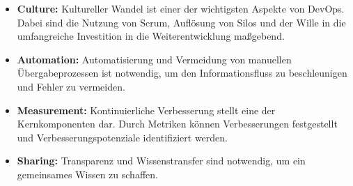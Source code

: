 \begin{itemize}
    \item \textbf{Culture:}
    Kultureller Wandel ist einer der wichtigsten Aspekte von DevOps.
    Dabei sind die Nutzung von Scrum, Auflösung von Silos und der Wille in die umfangreiche Investition in die Weiterentwicklung maßgebend.

    \item \textbf{Automation:}
    Automatisierung und Vermeidung von manuellen Übergabeprozessen ist notwendig, um den Informationsfluss zu beschleunigen und Fehler zu vermeiden.

    \item \textbf{Measurement:}
    Kontinuierliche Verbesserung stellt eine der Kernkomponenten dar.
    Durch Metriken können Verbesserungen festgestellt und Verbesserungspotenziale identifiziert werden.


    \item \textbf{Sharing:}
    Transparenz und Wissenstransfer sind notwendig, um ein gemeinsames Wissen zu schaffen.
\end{itemize}




